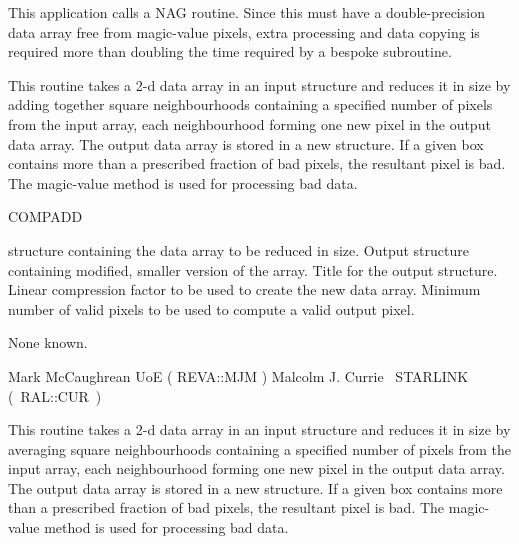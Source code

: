 {{{{         \sstitem
         This application calls a NAG routine.  Since this must have a
         double-precision data array free from magic-value pixels, extra
         processing and data copying is required more than doubling the
         time required by a bespoke subroutine.
      }
   }
}

\begin{manroutinedescription}
  This routine takes a 2-d data array in an input {} structure
  and reduces it in size by adding together square neighbourhoods
  containing a specified number of pixels from the input array,
  each neighbourhood forming one new pixel in the output data array.
  The output data array is stored in a new {} structure. If a
  given box contains more than a prescribed fraction of bad pixels,
  the resultant pixel is bad.  The magic-value method is used for
  processing bad data.

  COMPADD

\newpage
{}
\begin{manparametertable}
  {} structure containing the data array to be reduced in
  size.
  Output {} structure containing modified, smaller version
  of the array.
  Title for the output {} structure. \mbox{}
  Linear compression factor to be used to create the new data array.
  Minimum number of valid pixels to be used to compute a valid
  output pixel. \mbox{\mantt [\%COMPRESS]}
\end{manparametertable}
  None known.

  Mark McCaughrean UoE ( {\mantt REVA}::{\mantt MJM} )
  Malcolm J. Currie ~STARLINK \mbox{( {\mantt RAL}::{\mantt CUR} )}
\end{manroutinedescription}

\begin{manroutinedescription}
  This routine takes a 2-d data array in an input {} structure
  and reduces it in size by averaging square neighbourhoods
  containing a specified number of pixels from the input array,
  each neighbourhood forming one new pixel in the output data array.
  The output data array is stored in a new {} structure. If a
  given box contains more than a prescribed fraction of bad pixels,
  the resultant pixel is bad.  The magic-value method is used for
  processing bad data.


\end{manroutinedescription}}
